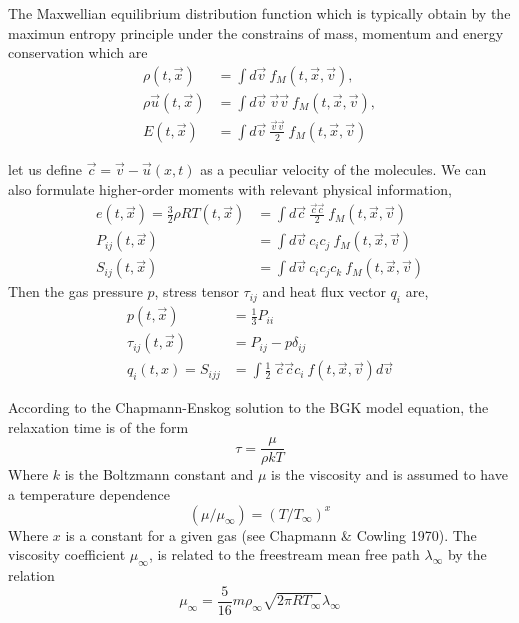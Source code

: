 \begin{frame} 
	The Maxwellian equilibrium distribution function which is typically obtain by the maximun entropy principle under the constrains of mass, momentum and energy conservation which are
	\begin{align}
	\rho(t,\vec{x}) 				&= \int d\vec{v} \ f_M(t,\vec{x},\vec{v}), \\
	\rho \vec{u}(t,\vec{x}) &= \int d\vec{v} \ \vec{v}\vec{v} \ f_M(t,\vec{x},\vec{v}), \\
	E(t,\vec{x}) 						&= \int d\vec{v} \ \frac{\vec{v}\vec{v}}{2} \ f_M(t,\vec{x},\vec{v})	
	\end{align}
	
\end{frame}

\begin{frame}
	let us define $\vec{c} = \vec{v} - \vec{u}(x,t)$ as a peculiar velocity of the molecules. We can also formulate higher-order moments with relevant physical information,
	\begin{align}
	e(t,\vec{x}) = \frac{3}{2}\rho RT(t,\vec{x}) 	&= \int d\vec{c} \ \frac{\vec{c}\vec{c}}{2} \ f_M(t,\vec{x},\vec{v})	\\
	P_{ij}(t,\vec{x}) 		&= \int d\vec{v} \ c_i c_j \ f_M(t,\vec{x},\vec{v}) \\
	S_{ij}(t,\vec{x}) 		&= \int d\vec{v} \ c_i c_j c_k \ f_M(t,\vec{x},\vec{v})
	\end{align}
	Then the gas pressure $p$, stress tensor $\tau_{ij}$ and heat flux vector $q_i$ are,
	\begin{align}
	p(t,\vec{x})					&=	\frac{1}{3} P_{ii} \\
	\tau_{ij}(t,\vec{x})	&= 	P_{ij}-p\delta_{ij} \\
	q_i(t,x) = S_{ijj} 		&=  \int \frac{1}{2} \ \vec{c}\vec{c} c_i \ f(t,\vec{x},\vec{v}) d\vec{v}
	\end{align}
\end{frame}

\begin{frame}
	According to the Chapmann-Enskog solution to the BGK model equation, the relaxation time is of the form
	\begin{equation}
		\tau = \frac{\mu}{\rho k T}
	\end{equation}
	Where $k$ is the Boltzmann constant and $\mu$ is the viscosity and is assumed to have a temperature dependence
	\begin{equation}
		(\mu/\mu_\infty) = (T/T_\infty)^x
	\end{equation}
	Where $x$ is a constant for a given gas (see Chapmann \& Cowling 1970). The viscosity coefficient $\mu_\infty$, is related to the freestream mean free path $\lambda_\infty$ by the relation
	\begin{equation}
		\mu_\infty = \frac{5}{16}m\rho_\infty \sqrt{2\pi RT_\infty} \lambda_\infty
	\end{equation}
\end{frame}

